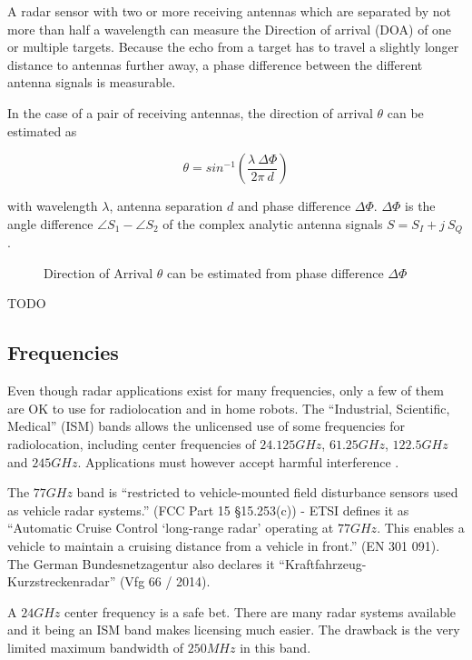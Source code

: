 A radar sensor with two or more receiving antennas which are separated
by not more than half a wavelength can measure the Direction of arrival
(DOA) of one or multiple targets. Because the echo from a target has to
travel a slightly longer distance to antennas further away, a phase
difference between the different antenna signals is measurable.

In the case of a pair of receiving antennas, the direction of arrival
\(\theta\) can be estimated \cite{VanZeijl2014} as

\[\theta = sin^{-1}\left({\frac{\lambda~\Delta\Phi}{2\pi ~d}}\right)\]

with wavelength \(\lambda\), antenna separation \(d\) and phase
difference \(\Delta\Phi\). \(\Delta\Phi\) is the angle difference
\(\angle S_1 - \angle S_2\) of the complex analytic antenna signals
\(S = S_I + j~S_Q\).

\begin{figure}[htp]
    \centering
    \label{fig:doa}
    \def\svgwidth{10cm}
    
    \caption{Direction of Arrival \(\theta\) can be estimated from phase difference \(\Delta\Phi\)}
\end{figure}

TODO
\cite{Hacker2010} \cite{Cho2017}

\subsection{Frequencies}\label{frequencies}

Even though radar applications exist for many frequencies, only a few of
them are OK to use for radiolocation and in home robots. The
``Industrial, Scientific, Medical'' (ISM) bands allows the unlicensed
use of some frequencies for radiolocation, including center frequencies
of \(24.125 GHz\), \(61.25 GHz\), \(122.5 GHz\) and \(245 GHz\).
Applications must however accept harmful interference \cite{FCC2017}.

The \(77 GHz\) band is ``restricted to vehicle-mounted field disturbance
sensors used as vehicle radar systems.'' (FCC Part 15 §15.253(c)) - ETSI
defines it as ``Automatic Cruise Control `long-range radar' operating at
\(77 GHz\). This enables a vehicle to maintain a cruising distance from
a vehicle in front.'' (EN 301 091). The German Bundesnetzagentur also
declares it ``Kraftfahrzeug-Kurzstreckenradar'' (Vfg 66 / 2014).

A \(24 GHz\) center frequency is a safe bet. There are many radar
systems available and it being an ISM band makes licensing much easier.
The drawback is the very limited maximum bandwidth of \(250MHz\) in this
band.

